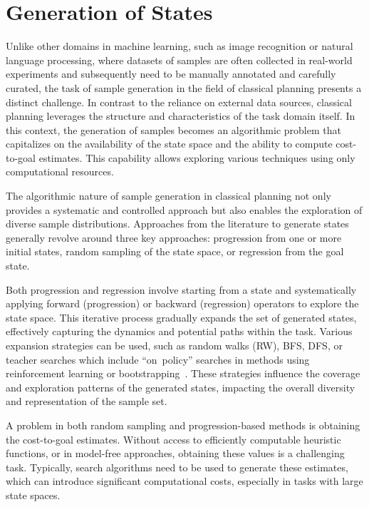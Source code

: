 \section{Generation of States}
\label{sec:generation}

Unlike other domains in machine learning, such as image recognition or natural language processing, where datasets of samples are often collected in real-world experiments and subsequently need to be manually annotated and carefully curated, the task of sample generation in the field of classical planning presents a distinct challenge. In contrast to the reliance on external data sources, classical planning leverages the structure and characteristics of the task domain itself. In this context, the generation of samples becomes an algorithmic problem that capitalizes on the availability of the state space and the ability to compute cost-to-goal estimates. This capability allows exploring various techniques using only computational resources.

The algorithmic nature of sample generation in classical planning not only provides a systematic and controlled approach but also enables the exploration of diverse sample distributions. Approaches from the literature to generate states generally revolve around three key approaches: progression from one or more initial states, random sampling of the state space, or regression from the goal state.

Both progression and regression involve starting from a state and systematically applying forward (progression) or backward (regression) operators to explore the state space. This iterative process gradually expands the set of generated states, effectively capturing the dynamics and potential paths within the task. Various expansion strategies can be used, such as random walks (RW), BFS, DFS, or teacher searches which include ``on~policy'' searches in methods using reinforcement learning or bootstrapping~\cite{Arfaee.etal/2011}. These strategies influence the coverage and exploration patterns of the generated states, impacting the overall diversity and representation of the sample set.

A problem in both random sampling and progression-based methods is obtaining the cost-to-goal estimates. Without access to efficiently computable heuristic functions, or in model-free approaches, obtaining these values is a challenging task. Typically, search algorithms need to be used to generate these estimates, which can introduce significant computational costs, especially in tasks with large state spaces.

